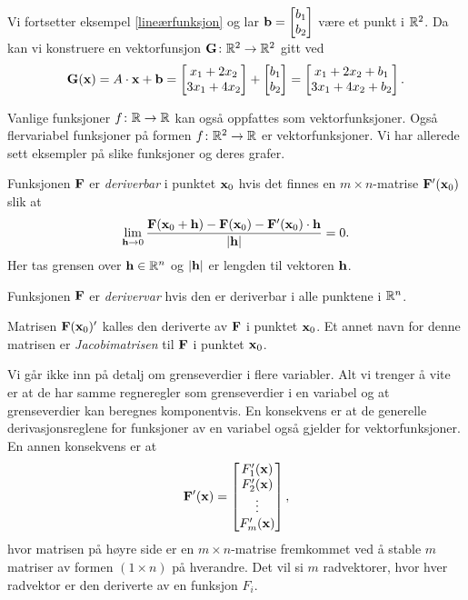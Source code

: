 \begin{eksempel}\label{affinfunksjon}
  Vi fortsetter eksempel \ref{lineærfunksjon} og lar $\mathbf{b} = \begin{bmatrix}b_1\\b_2\end{bmatrix}$
  være et punkt i $\mathbb{R}^2$.
  Da kan vi konstruere en vektorfunsjon $\mathbf{G} \colon \mathbb{R}^2 \to \mathbb{R}^2$ gitt ved
  $$\mathbf{G}(\mathbf{x}) = A \cdot \mathbf{x} + \mathbf{b} = \begin{bmatrix} x_1 + 2x_2 \\ 3x_1 + 4x_2
    \end{bmatrix} + \begin{bmatrix} b_1 \\ b_2 \end{bmatrix} = \begin{bmatrix}
  x_1 + 2x_2 + b_1 \\ 3x_1 + 4x_2 + b_2 \end{bmatrix}.$$
\end{eksempel}
\begin{eksempel}
  Vanlige funksjoner $f \colon \mathbb{R} \to \mathbb{R}$ kan også oppfattes som vektorfunksjoner.
  Også flervariabel funksjoner på formen $f \colon \mathbb{R}^2 \to \mathbb{R}$ er vektorfunksjoner.
  Vi har allerede sett eksempler på slike funksjoner og deres grafer.
\end{eksempel}
\begin{definisjon}
  Funksjonen $\mathbf{F}$ er {\em deriverbar} i punktet $\mathbf{x}_0$ hvis det finnes en
  $m \times n$-matrise $\mathbf{F}'(\mathbf{x}_0)$ slik at
  $$\lim_{\mathbf{h}\to 0} \frac{\mathbf{F}(\mathbf{x}_0+\mathbf{h}) - \mathbf{F}(\mathbf{x}_0) -
  \mathbf{F}'(\mathbf{x}_0) \cdot \mathbf{h}}{|\mathbf{h}|} = 0.$$
  Her tas grensen over $\mathbf{h} \in \mathbb{R}^n$ og $| \mathbf{h}|$ er lengden til vektoren $\mathbf{h}$.

  Funksjonen $\mathbf{F}$ er {\em derivervar} hvis den er deriverbar i alle punktene i
  $\mathbb{R}^n$.

  Matrisen $\mathbf{F}(\mathbf{x}_0)'$ kalles den deriverte av $\mathbf{F}$ i punktet $\mathbf{x}_0$. Et annet
  navn for denne matrisen er {\em Jacobimatrisen} til $\mathbf{F}$ i punktet $\mathbf{x}_0$.
\end{definisjon}


Vi går ikke inn på detalj om grenseverdier i flere variabler.
Alt vi trenger å vite er at de har samme regneregler som grenseverdier i en variabel
og at grenseverdier kan beregnes komponentvis.
En konsekvens er at de generelle derivasjonsreglene for funksjoner av en variabel også
gjelder for vektorfunksjoner.
En annen konsekvens er at 
$$\mathbf{F}'(\mathbf{x}) = \begin{bmatrix} F'_1(\mathbf{x}) \\ F'_2(\mathbf{x})
\\ \vdots \\ F'_m(\mathbf{x}) \end{bmatrix},$$
hvor matrisen på høyre side er en $m \times n$-matrise fremkommet ved å stable
$m$ matriser av formen $(1 \times n)$ på hverandre.
Det vil si $m$ radvektorer, hvor hver radvektor er den deriverte av en funksjon $F_i$.

